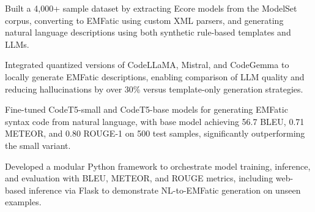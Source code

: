 \vspace{3pt}
\begin{tightemize}
    \item Built a 4,000+ sample dataset by extracting Ecore models from the ModelSet corpus, converting to EMFatic using custom XML parsers, and generating natural language descriptions using both synthetic rule-based templates and LLMs.
    \item Integrated quantized versions of CodeLLaMA, Mistral, and CodeGemma to locally generate EMFatic descriptions, enabling comparison of LLM quality and reducing hallucinations by over 30\% versus template-only generation strategies.
    \item Fine-tuned CodeT5-small and CodeT5-base models for generating EMFatic syntax code from natural language, with base model achieving 56.7 BLEU, 0.71 METEOR, and 0.80 ROUGE-1 on 500 test samples, significantly outperforming the small variant.
    \item Developed a modular Python framework to orchestrate model training, inference, and evaluation with BLEU, METEOR, and ROUGE metrics, including web-based inference via Flask to demonstrate NL-to-EMFatic generation on unseen examples.
\end{tightemize}